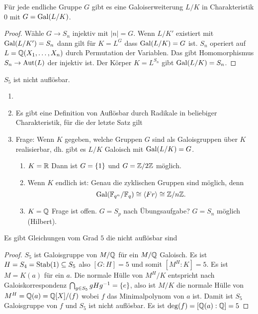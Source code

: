 \begin{Satz}
    Für jede endliche Gruppe \(G\) gibt es eine Galoiserweiterung \(L/K\) in Charakteristik \(0\) mit \(G=\operatorname{Gal}(L/K)\).
\end{Satz}
\begin{proof}
    Wähle \(G\to S_n\) injektiv mit \(|n|=G\). Wenn \(L/K'\) existiert mit \(\operatorname{Gal}(L/K')=S_n\) dann gilt für \(K=L^G\) dass \(\operatorname{Gal}(L/K)=G\) ist.
    \(S_n\) operiert auf \(L=\mathbb{Q}(X_1,\dots,X_n)\) durch Permutation der Variablen. Das gibt Homomorphismus \(S_n\to\operatorname{Aut}(L)\) der injektiv ist. Der Körper \(K=L^{S_n}\) gibt \(\operatorname{Gal}(L/K)=S_n\).
\end{proof}
\begin{Bem}
    \(S_5\) ist nicht auflösbar. 
\end{Bem}
\begin{Bem}
    \begin{enumerate}
        \item[]
        \item Es gibt eine Definition von Auflösbar durch Radikale in beliebiger Charakteristik, für die der letzte Satz gilt
        \item Frage: Wenn \(K\) gegeben, welche Gruppen \(G\) sind als Galoisgruppen über \(K\) realisierbar, dh. gibt es \(L/K\) Galoisch mit \(\operatorname{Gal}(L/K)=G\).
        \begin{enumerate}
            \item \(K=\mathbb{R}\) Dann ist \(G=\{1\}\) und \(G=\mathbb{Z}/2\mathbb{Z}\) möglich.
            \item Wenn \(K\) endlich ist: Genau die zyklischen Gruppen sind möglich, denn \[\operatorname{Gal}(\mathbb{F}_{q^n}/\mathbb{F}_q)\cong\langle Fr\rangle\cong\mathbb{Z}/n\mathbb{Z}.\]
            \item \(K=\mathbb{Q}\) Frage ist offen. \(G=S_p\) nach Übungsaufgabe?
            \(G=S_n\) möglich (Hilbert).
        \end{enumerate}
    \end{enumerate}
\end{Bem}
\begin{Satz}
    Es gibt Gleichungen vom Grad \(5\) die nicht auflösbar sind
    \end{Satz}
    \begin{proof}
        \(S_5\) ist Galoisgruppe von \(M/\mathbb{Q}\) für ein \(M/\mathbb{Q}\) Galoisch. Es ist \(H=S_4=\operatorname{Stab}(1)\subseteq S_5\) also \([G:H]=5\) und somit \([M^H:K]=5\). Es ist \(M=K(a)\) für ein \(a\). Die normale Hülle von \(M^H/K\) entspricht nach Galoiskorrespondenz \(\bigcap_{g\in S_5}gHg^{-1}=\{e\}\), also ist \(M/K\) die normale Hülle von \(M^H=\mathbb{Q}(a)=\mathbb{Q}[X]/(f)\) wobei \(f\) das Minimalpolynom von \(a\) ist. Damit ist \(S_5\) Galoisgruppe von \(f\) und \(S_5\) ist nicht auflösbar. Es ist \(\deg(f)=[\mathbb{Q}(a):\mathbb{Q}]=5\)
    \end{proof}